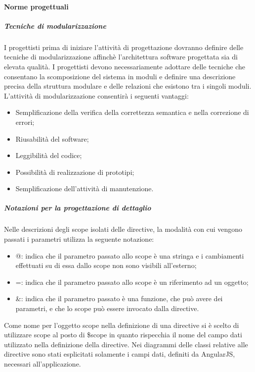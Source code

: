 \paragraph{Norme progettuali}
\subparagraph{Tecniche di modularizzazione}
I progettisti prima di iniziare l'attività di progettazione dovranno definire delle tecniche di modularizzazione affinchè l'architettura software progettata sia di elevata qualità.
I progettisti devono necessariamente adottare delle tecniche che consentano la scomposizione del sistema in moduli e definire una descrizione precisa della struttura modulare e delle relazioni che esistono tra i singoli moduli. 
L'attività di modularizzazione consentirà i seguenti vantaggi:
\begin{itemize}
\item
Semplificazione della verifica della correttezza semantica e nella correzione di errori;
\item
Riusabilità del software;
\item
Leggibilità del codice;
\item
Possibilità di realizzazione di prototipi;
\item
Semplificazione dell'attività di manutenzione.
\end{itemize}

\subparagraph{Notazioni per la progettazione di dettaglio}

Nelle descrizioni degli scope isolati delle directive, la modalità con cui vengono passati i parametri utilizza la seguente notazione:
\begin{itemize}
\item 
@: indica che il parametro passato allo scope è una stringa e i cambiamenti effettuati su di essa dallo scope non sono visibili all'esterno;
\item
=: indica che il parametro passato allo scope è un riferimento ad un oggetto;
\item
\&: indica che il parametro passato è una funzione, che può avere dei parametri, e che lo scope può essere invocato dalla directive.
\end{itemize}
Come nome per l’oggetto scope nella definizione di una directive si è scelto di utilizzare scope al posto di \$scope in quanto rispecchia il nome del campo dati utilizzato nella definizione della directive.
Nei diagrammi delle classi relative alle directive sono stati esplicitati solamente i campi dati, definiti da AngularJS, necessari all’applicazione.

